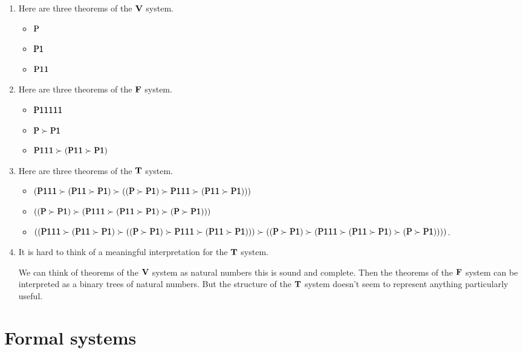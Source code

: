 \documentclass[11pt,letterpaper]{article}
\begin{document}
\begin{enumerate}
  \item
    Here are three theorems of the $\mathbf{V}$ system.
    \begin{itemize}
      \item
        $\mathqd{P}$
      \item
        $\mathqd{P1}$
      \item
        $\mathqd{P11}$
    \end{itemize}

  \item
    Here are three theorems of the $\mathbf{F}$ system.
    \begin{itemize}
      \item
        $\mathqd{P11111}$
      \item
        $\mathqd{P} \succ \mathqd{P1}$
      \item
        $\mathqd{P111} \succ (\mathqd{P11} \succ \mathqd{P1})$
    \end{itemize}

  \item
    Here are three theorems of the $\mathbf{T}$ system.
    \begin{itemize}
        \newcommand{\xxx}{%
          \mathqd{P111} \succ (\mathqd{P11} \succ \mathqd{P1})%
        }
        \newcommand{\yyy}{%
          (\mathqd{P} \succ \mathqd{P1})%
        }
        \newcommand{\tone}{(\xxx \succ (\yyy \succ \xxx))}
        \newcommand{\ttwo}{(\yyy \succ (\xxx \succ \yyy))}
      \item
        $\tone$
      \item
        $\ttwo$
      \item
        $(\tone \succ \ttwo)$.
    \end{itemize}

  \item
    It is hard to think of a meaningful interpretation for the $\mathbf{T}$ system.

    We can think of theorems of the $\mathbf{V}$ system as natural numbers this is
    sound and complete.
    Then the theorems of the $\mathbf{F}$ system can be interpreted as a binary
    trees of natural numbers.
    But the structure of the $\mathbf{T}$ system doesn't seem to represent anything
    particularly useful.
\end{enumerate}

\section{Formal systems}
\end{document}
